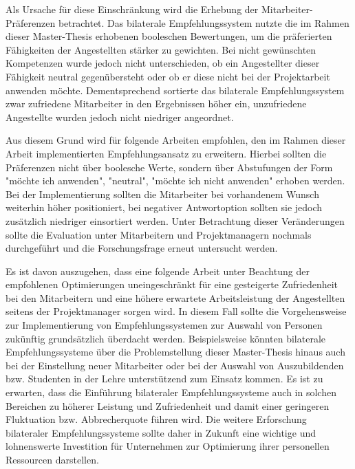 Als Ursache für diese Einschränkung wird die Erhebung der Mitarbeiter-Präferenzen betrachtet. Das bilaterale Empfehlungssystem nutzte die im Rahmen dieser Master-Thesis erhobenen booleschen Bewertungen, um die präferierten Fähigkeiten der Angestellten stärker zu gewichten. Bei nicht gewünschten Kompetenzen wurde jedoch nicht unterschieden, ob ein Angestellter dieser Fähigkeit neutral gegenübersteht oder ob er diese nicht bei der Projektarbeit anwenden möchte. Dementsprechend sortierte das bilaterale Empfehlungssystem zwar zufriedene Mitarbeiter in den Ergebnissen höher ein, unzufriedene Angestellte wurden jedoch nicht niedriger angeordnet.

Aus diesem Grund wird für folgende Arbeiten empfohlen, den im Rahmen dieser Arbeit implementierten Empfehlungsansatz zu erweitern. Hierbei sollten die Präferenzen nicht über boolesche Werte, sondern über Abstufungen der Form "möchte ich anwenden", "neutral", "möchte ich nicht anwenden" erhoben werden. Bei der Implementierung sollten die Mitarbeiter bei vorhandenem Wunsch weiterhin höher positioniert, bei negativer Antwortoption sollten sie jedoch zusätzlich niedriger einsortiert werden. Unter Betrachtung dieser Veränderungen sollte die Evaluation unter Mitarbeitern und Projektmanagern nochmals durchgeführt und die Forschungsfrage erneut untersucht werden.

Es ist davon auszugehen, dass eine folgende Arbeit unter Beachtung der empfohlenen Optimierungen uneingeschränkt für eine gesteigerte Zufriedenheit bei den Mitarbeitern und eine höhere erwartete Arbeitsleistung der Angestellten seitens der Projektmanager sorgen wird. In diesem Fall sollte die Vorgehensweise zur Implementierung von Empfehlungssystemen zur Auswahl von Personen zukünftig grundsätzlich überdacht werden. Beispielsweise könnten bilaterale Empfehlungssysteme über die Problemstellung dieser Master-Thesis hinaus auch bei der Einstellung neuer Mitarbeiter oder bei der Auswahl von Auszubildenden bzw. Studenten in der Lehre unterstützend zum Einsatz kommen. Es ist zu erwarten, dass die Einführung bilateraler Empfehlungssysteme auch in solchen Bereichen zu höherer Leistung und Zufriedenheit und damit einer geringeren Fluktuation bzw. Abbrecherquote führen wird. Die weitere Erforschung bilateraler Empfehlungssysteme sollte daher in Zukunft eine wichtige und lohnenswerte Investition für Unternehmen zur Optimierung ihrer personellen Ressourcen darstellen.
